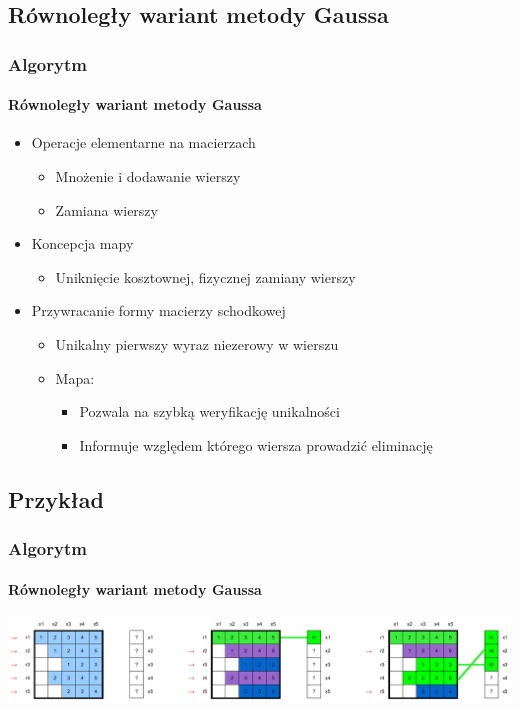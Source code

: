 \documentclass[12pt,handout]{beamer}
\begin{document}
\subsection{Równoległy wariant metody Gaussa}
\begin{frame}
\frametitle{Algorytm}
\framesubtitle{Równoległy wariant metody Gaussa}

\begin{itemize}[<+->]
\item Operacje elementarne na macierzach
\begin{itemize}
\item Mnożenie i dodawanie wierszy
\item Zamiana wierszy
\end{itemize}
\item Koncepcja mapy
\begin{itemize}
\item Uniknięcie kosztownej, fizycznej zamiany wierszy
\end{itemize}
\item Przywracanie formy macierzy schodkowej
	\begin{itemize}
	\item Unikalny pierwszy wyraz niezerowy w wierszu
	\item Mapa:
		\begin{itemize}
		\item Pozwala na szybką weryfikację unikalności
		\item Informuje względem którego wiersza prowadzić eliminację
		\end{itemize}
	\end{itemize}
\end{itemize}
\end{frame}

\subsection{Przykład}

\begin{frame}
\frametitle{Algorytm}
\framesubtitle{Równoległy wariant metody Gaussa}
\hfill\includegraphics[scale=0.3]{faza1_initialSelections.png}\hspace*{\fill}
\end{frame}
\end{document}
